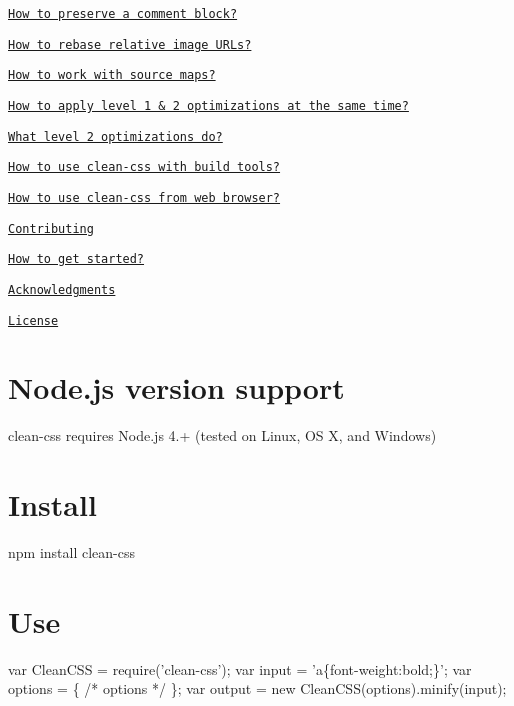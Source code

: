 \begin{DoxyItemize}
\begin{DoxyItemize}
\item \href{#how-to-preserve-a-comment-block}{\tt How to preserve a comment block?}
\item \href{#how-to-rebase-relative-image-urls}{\tt How to rebase relative image U\+R\+Ls?}
\item \href{#how-to-work-with-source-maps}{\tt How to work with source maps?}
\item \href{#how-to-apply-level-1--2-optimizations-at-the-same-time}{\tt How to apply level 1 \& 2 optimizations at the same time?}
\item \href{#what-level-2-optimizations-do}{\tt What level 2 optimizations do?}
\item \href{#how-to-use-clean-css-with-build-tools}{\tt How to use clean-\/css with build tools?}
\item \href{#how-to-use-clean-css-from-web-browser}{\tt How to use clean-\/css from web browser?}
\end{DoxyItemize}
\item \href{#contributing}{\tt Contributing}
\begin{DoxyItemize}
\item \href{#how-to-get-started}{\tt How to get started?}
\end{DoxyItemize}
\item \href{#acknowledgments}{\tt Acknowledgments}
\item \href{#license}{\tt License}
\end{DoxyItemize}

\section*{Node.\+js version support}

clean-\/css requires Node.\+js 4.+ (tested on Linux, OS X, and Windows)

\section*{Install}


\begin{DoxyCode}
npm install clean-css
\end{DoxyCode}


\section*{Use}


\begin{DoxyCode}
var CleanCSS = require('clean-css');
var input = 'a\{font-weight:bold;\}';
var options = \{ /* options */ \};
var output = new CleanCSS(options).minify(input);
\end{DoxyCode}


